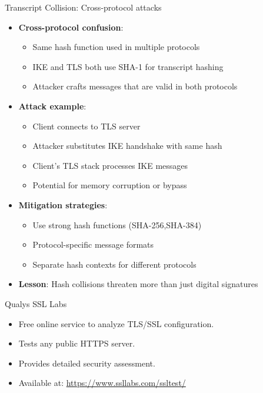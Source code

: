 \documentclass[aspectratio=169, lualatex, handout]{beamer}
\begin{document}
\begin{frame}{Transcript Collision: Cross-protocol attacks}
	\begin{itemize}[<+->]
		\item \textbf{Cross-protocol confusion}:
		      \begin{itemize}
			      \item Same hash function used in multiple protocols
			      \item IKE and TLS both use SHA-1 for transcript hashing
			      \item Attacker crafts messages that are valid in both protocols
		      \end{itemize}
		\item \textbf{Attack example}:
		      \begin{itemize}
			      \item Client connects to TLS server
			      \item Attacker substitutes IKE handshake with same hash
			      \item Client's TLS stack processes IKE messages
			      \item Potential for memory corruption or bypass
		      \end{itemize}
		\item \textbf{Mitigation strategies}:
		      \begin{itemize}
			      \item Use strong hash functions (SHA-256,SHA-384)
			      \item Protocol-specific message formats
			      \item Separate hash contexts for different protocols
		      \end{itemize}
		\item \textbf{Lesson}: Hash collisions threaten more than just digital signatures
	\end{itemize}
\end{frame}

\begin{frame}{Qualys SSL Labs}
	\begin{itemize}
		\item Free online service to analyze TLS/SSL configuration.
		\item Tests any public HTTPS server.
		\item Provides detailed security assessment.
		\item Available at: \url{https://www.ssllabs.com/ssltest/}
	\end{itemize}
\end{frame}
\end{document}
